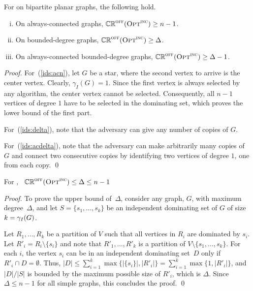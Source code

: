 \begin{proposition}
\label{prop:ids-onopt}
For \ids on bipartite planar graphs, the following hold.
\begin{enumerate}[(i)]
\item \label{ids:acn}
 On always-connected graphs, $\mathbb{CR}^{\textsc{off}}(\operatorname{\textsc{Opt}}^\textsc{\ensuremath{\text{inc}}}) \geq n-1$. 
\item \label{ids:delta}
 On bounded-degree graphs, $\mathbb{CR}^{\textsc{off}}(\operatorname{\textsc{Opt}}^\textsc{\ensuremath{\text{inc}}}) \geq \Delta$.
\item \label{ids:acdelta}
 On always-connected bounded-degree graphs, $\mathbb{CR}^{\textsc{off}}(\operatorname{\textsc{Opt}}^\textsc{\ensuremath{\text{inc}}}) \ge \Delta-1$.
\end{enumerate}
\end{proposition}
\begin{proof}
For~(\ref{ids:acn}), let $G$ be a star, where the second vertex to
arrive is the center vertex.
Clearly, $\gamma_I(G) = 1$. 
Since the first vertex is always selected by any \incr
algorithm, the center vertex 
cannot be selected. Consequently, all $n-1$ vertices of 
degree $1$ have to be selected in the dominating set, which proves
the lower bound of the first part.

For~(\ref{ids:delta}), note that the adversary can
give any number of copies of $G$.

For~(\ref{ids:acdelta}), note that the adversary can
make arbitrarily many copies of $G$ and connect two consecutive copies
by identifying two vertices of degree $1$, one from each copy.
\qed\end{proof}

\begin{proposition}
\label{prop:ids-onopt-upper}
For \ids, \, $\mathbb{CR}^{\textsc{off}}(\operatorname{\textsc{Opt}}^\textsc{\ensuremath{\text{inc}}}) \leq \Delta \leq  n-1$
\end{proposition}
\begin{proof}
To prove the upper bound of~$\Delta$, consider any graph, $G$, with
maximum degree~$\Delta$, and
let $S = \{s_1,\ldots, s_k\}$
 be an independent dominating 
set of $G$ of size $k=\gamma_I(G)$.

Let $R_1, \ldots, R_k$ be a partition of $V$ such that all vertices in $R_i$ 
are dominated by $s_i$. Let $R'_i = R_i \setminus \{s_i\}$ and note that 
$R'_1,\ldots, R'_k$ is a partition of $V \setminus \{s_1,\ldots, s_k\}$.
For each $i$, the vertex $s_i$ can be in an independent dominating set~$D$
only if $R'_i \cap D = \emptyset$.
Thus, $|D| \leq \sum_{i=1}^k \max\{ |\{ s_i\}|, |R'_i|\}
= \sum_{i=1}^k \max\{ 1, |R'_i|\}$, and
$|D|/|S|$ is bounded by the maximum possible size of $R'_i$, which
is $\Delta$.
Since $\Delta\leq n-1$ for all simple graphs, this concludes the proof.
\qed\end{proof}

